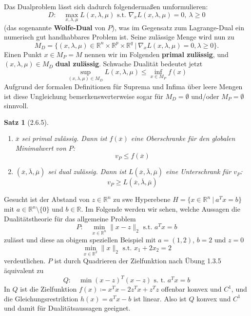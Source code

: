 \documentclass[12pt]{extreport} %
\newcommand{\R}{\mathbb{R}}
\theoremstyle{named}
\theoremstyle{nnamed}
\theoremstyle{itshape}
\newtheorem*{satz}{Satz}
\theoremstyle{normal}
\begin{document}
Das Dualproblem lässt sich dadurch folgendermaßen umformulieren:
	$$ D: \quad \max_{x, \lambda, \mu} L(x, \lambda, \mu) \text{ s.t. } \nabla_x L(x, \lambda, \mu) =0, ~ \lambda \geq 0 $$
(das sogenannte \textbf{Wolfe-Dual} von $P$), was im Gegensatz zum Lagrange-Dual ein numerisch gut handhabbares Problem ist.	Seine zulässige Menge wird nun zu
	$$ M_D = \{ (x, \lambda, \mu) \in \R^n \times \R^p \times \R^q ~|~\nabla_x L(x, \lambda, \mu) = 0, \lambda \geq 0 \}. $$
Einen Punkt $x \in M_P = M$ nennen wir im Folgenden \textbf{primal zulässig}, und $(x, \lambda, \mu) \in M_D$ \textbf{dual zulässig}. Schwache Dualität bedeutet jetzt
	$$ \sup_{(x, \lambda, \mu) \in M_D} L(x, \lambda, \mu) \leq \inf_{x \in M_P} f(x) $$
	Aufgrund der formalen Definitionen für Suprema und Infima über leere Mengen ist diese Ungleichung bemerkenswerterweise sogar für $M_D = \emptyset$ und/oder $M_P = \emptyset$ sinnvoll.
	
\begin{satz}[2.6.5] ~\
	\begin{enumerate}
		\item $\overline{x}$ sei primal zulässig. Dann ist $f(\overline{x})$ eine Oberschranke für den globalen Minimalwert von $P$:
			$$ v_P \leq f(\overline{x}) $$
		\item $(\overline{x}, \overline{\lambda}, \overline{\mu})$ sei dual zulässig. Dann ist $L(\overline{x}, \overline{\lambda}, \overline{\mu})$ eine Unterschrank für $v_P$:
			$$ v_P \geq L(\overline{x}, \overline{\lambda}, \overline{\mu}) $$
	\end{enumerate}	
\end{satz}
	
\begin{beispiel}
	Gesucht ist der Abstand von $z \in \R^n$ zu swe Hyperebene $H = \{ x \in \R^n ~|~ a^Tx = b \}$	 mit $a \in \R^n \setminus \{ 0 \}$ und $b \in \R$. Im Folgende werden wir sehen, welche Aussagen die Dualitätstheorie für das allgemeine Problem
	$$ P: \quad \min_{x \in \R^n} \| x - z \|_2 \text{ s.t. } a^T x = b $$
	zulässt und diese an obigem speziellen Beispiel mit $a = (1, 2)$, $b = 2$ und $z = 0$
	$$ \min_{x \in \R^2} \| x\|_2 \text{ s.t. } x_1 + 2x_2 = 2 $$
	verdeutlichen. $P$ ist durch Quadrieren der Zielfunktion nach Übung 1.3.5 äquivalent zu
	$$ Q: \quad \min (x - z)^T(x - z) \text{ s. t. } a^T x = b $$
	In $Q$ ist die Zielfunktion $f(x) \coloneqq x^T x - 2z^T x + z^T z$ offenbar konvex und $C^1$, und die Gleichungsrestriktion $h(x) = a^Tx - b$ ist linear. Also ist $Q$ konvex und $C^1$ und damit für Dualitätsaussagen geeignet.
\end{beispiel}
\end{document}
